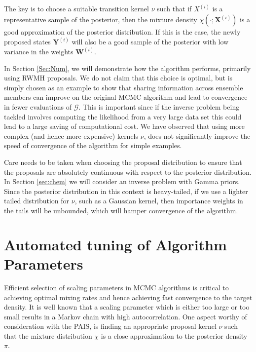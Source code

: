 \documentclass[final]{siamltex}
\newcommand{\G}{\mathcal{G}}
\newcommand{\X}{{\mathbf X}}
\newcommand{\Y}{{\mathbf Y}}
\newcommand{\W}{{\mathbf W}}
\begin{document}
The key is to choose a suitable transition kernel $\nu$ such that
if $X^{(i)}$ is a representative sample of the posterior,
then the mixture density $\chi(\cdot;\X^{(i)})$ is a good
approximation of the posterior distribution. If this is the case,
the newly proposed states $\Y^{(i)}$ will also be a good sample of the posterior with low variance in the
weights $\W^{(i)}$.

In Section \ref{Sec:Num}, we will demonstrate how the algorithm
performs, primarily using RWMH proposals. We do not claim that this choice is optimal, but
is simply chosen as an example to show that sharing information across
ensemble members can improve on the original MCMC algorithm and lead to
convergence in fewer evaluations of $\G$. This is important since if
the inverse problem being tackled involves computing
the likelihood from a very large data set this could lead to a
large saving of computational cost. We have observed that
using more complex (and hence more expensive) kernels $\nu$, does not
significantly improve the speed of convergence of the algorithm for
simple examples\cite{Paul}.

Care needs to be taken when choosing the proposal distribution to
ensure that the proposals are absolutely continuous with respect to
the posterior distribution. In Section \ref{sec:chem} we will consider
an inverse problem with Gamma priors. Since the posterior distribution
in this context is heavy-tailed, if we use a lighter tailed
distribution for $\nu$, such as a Gaussian kernel, then importance
weights in the tails will be unbounded, which will hamper convergence
of the algorithm.

\section{Automated tuning of Algorithm Parameters}\label{Sec:adapt}

Efficient selection of scaling parameters in MCMC algorithms is
critical to achieving optimal mixing rates and hence achieving fast
convergence to the target density. It is well known that a scaling
parameter which is either too large or too small results in a Markov
chain with high autocorrelation. One aspect worthy of consideration
with the PAIS, is finding an appropriate proposal kernel $\nu$ such
that the mixture distribution $\chi$ is a close approximation to the
posterior density $\pi$.

\end{document}
